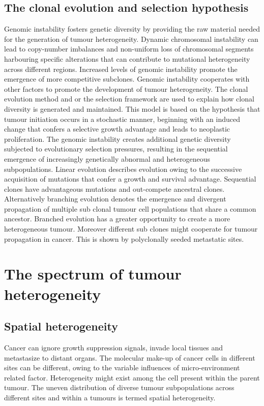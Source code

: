 	\subsection{The clonal evolution and selection hypothesis}
	Genomic instability fosters genetic diversity by providing the raw material needed for the generation of tumour heterogeneity.
	Dynamic chromosomal instability can lead to copy-number imbalances and non-uniform loss of chromosomal segments harbouring specific alterations that can contribute to mutational heterogeneity across different regions.
	Increased levels of genomic instability promote the emergence of more competitive subclones.
	Genomic instability cooperates with other factors to promote the development of tumour heterogeneity.
	The clonal evolution method and or the selection framework are used to explain how clonal diversity is generated and maintained.
	This model is based on the hypothesis that tumour initiation occurs in a stochastic manner, beginning with an induced change that confers a selective growth advantage and leads to neoplastic proliferation.
	The genomic instability creates additional genetic diversity subjected to evolutionary selection pressures, resulting in the sequential emergence of increasingly genetically abnormal and heterogeneous subpopulations.
	Linear evolution describes evolution owing to the successive acquisition of mutations that confer a growth and survival advantage.
	Sequential clones have advantageous mutations and out-compete ancestral clones.
	Alternatively branching evolution denotes the emergence and divergent propagation of multiple sub clonal tumour cell populations that share a common ancestor.
	Branched evolution has a greater opportunity to create a more heterogeneous tumour.
	Moreover different sub clones might cooperate for tumour propagation in cancer.
	This is shown by polyclonally seeded metastatic sites.

\section{The spectrum of tumour heterogeneity}

	\subsection{Spatial heterogeneity}
	Cancer can ignore growth suppression signals, invade local tissues and metastasize to distant organs.
	The molecular make-up of cancer cells in different sites can be different, owing to the variable influences of micro-environment related factor.
	Heterogeneity might exist among the cell present within the parent tumour.
	The uneven distribution of diverse tumour subpopulations across different sites and within a tumours is termed spatial heterogeneity.

